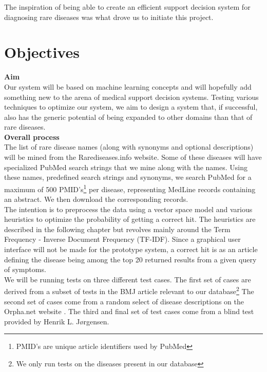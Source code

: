 The inspiration of being able to create an efficient support decision
system for diagnosing rare diseases was what drove us to initiate this
project.

\section{Objectives}

\textbf{Aim} \\
Our system will be based on machine learning concepts and will
hopefully add something new to the arena of medical support decision
systems. Testing various techniques to optimize our system, we aim to
design a system that, if successful, also has the generic potential of
being expanded to other domains than that of rare diseases.\\

\textbf{Overall process} \\
The list of rare disease names (along with synonyms and optional
descriptions) will be mined from the Rarediseases.info website. Some
of these diseases will have specialized PubMed search strings that we
mine along with the names. Using these names, predefined search
strings and synonyms, we search PubMed for a maximum of 500
PMID's\footnote{PMID's are unique article identifiers used by PubMed}
per disease, representing MedLine records containing an abstract. We
then download the corresponding records.\\

The intention is to preprocess the data using a vector space model and
various heuristics to optimize the probability of getting a correct
hit. The heuristics are described in the following chapter but
revolves mainly around the Term Frequency - Inverse Document Frequency
(TF-IDF). Since a graphical user interface will not be made for the
prototype system, a correct hit is as an article defining the disease
being among the top 20 returned results from a given query of
symptoms.\\

We will be running tests on three different test cases. The first set
of cases are derived from a subset of tests in the BMJ article
\cite{HangwiTang11102006} relevant to our database\footnote{We only
  run tests on the diseases present in our database} The second set of
cases come from a random select of disease descriptions on the
Orpha.net website \cite{Orphanet}. The third and final set of test
cases come from a blind test provided by Henrik L. J\o rgensen.\\

